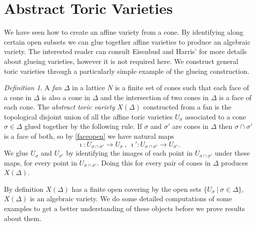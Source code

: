 \documentclass[BSc]{usydthesis}
\numberwithin{equation}{chapter}
\theoremstyle{remark}
\newtheorem{Definition}[equation]{Definition}
\begin{document}
\section{Abstract Toric Varieties}

We have seen how to create an affine variety from a cone. By identifying along certain open subsets we can glue together affine varieties to produce an algebraic variety. The interested reader can consult Eisenbud and Harris' \cite[Page.~ 33, \S I.2.4.]{EisenbudHarris} for more details about glueing varieties, however it is not required here. We construct general toric varieties through a particularly simple example of the glueing construction. 

\begin{Definition}
 A {\em fan} $\Delta$ in a lattice $N$ is a finite set of cones such that each face of a cone in $\Delta$ is also a cone in $\Delta$ and the intersection of two cones in $\Delta$ is a face of each cone. The {\em abstract toric variety} $X(\Delta)$ constructed from a fan is the topological disjoint union of all the affine toric varieties $U_{\sigma}$ associated to a cone $\sigma\in \Delta$ glued together by the following rule. If $\sigma$ and $\sigma'$ are cones in $\Delta$ then $\sigma\cap \sigma'$ is a face of both, so by \ref{faceopen} we have natural maps $$ \imath: U_{\sigma\cap \sigma'} \to U_{\sigma} \ , \ \imath': U_{\sigma\cap \sigma'} \to U_{\sigma'}.$$ We glue $U_{\sigma}$ and $U_{\sigma'}$ by identifying the images of each point in $U_{\sigma \cap \sigma'}$ under these maps, for every point in $U_{\sigma \cap \sigma'}.$ Doing this for every pair of cones in $\Delta$ produces $X(\Delta).$
\end{Definition}

By definition $X(\Delta)$ has a finite open covering by the open sets $\{ U_{\sigma} \ | \ \sigma \in \Delta \},$ $X(\Delta)$ is an algebraic variety. We do some detailed computations of some examples to get a better understanding of these objects before we prove results about them.  
\end{document}
